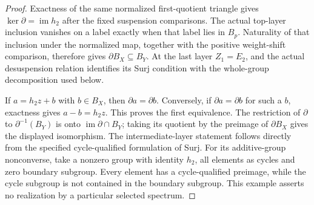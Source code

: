 \begin{proof}
Exactness of the same normalized first-quotient triangle gives
$\ker\partial=\operatorname{im}h_2$ after the fixed suspension comparisons.
The actual top-layer inclusion vanishes on a label exactly when that
label lies in $B_p$. Naturality of that inclusion under the normalized
map, together with the positive weight-shift comparison, therefore gives
$\partial B_X\subseteq B_Y$. At the last layer $Z_1=E_2$, and the
actual desuspension relation identifies its Surj condition with the
whole-group decomposition used below.

If $a=h_2z+b$ with $b\in B_X$, then $\partial a=\partial b$.
Conversely, if $\partial a=\partial b$ for such a $b$, exactness gives
$a-b=h_2z$. This proves the first equivalence. The restriction of
$\partial$ to $\partial^{-1}(B_Y)$ is onto
$\operatorname{im}\partial\cap B_Y$; taking its quotient by the
preimage of $\partial B_X$ gives the displayed isomorphism.
The intermediate-layer statement follows directly from the specified
cycle-qualified formulation of Surj. For its additive-group nonconverse,
take a nonzero group with identity $h_2$, all elements as cycles and zero
boundary subgroup. Every element has a cycle-qualified preimage, while
the cycle subgroup is not contained in the boundary subgroup. This
example asserts no realization by a particular selected spectrum.
\end{proof}

